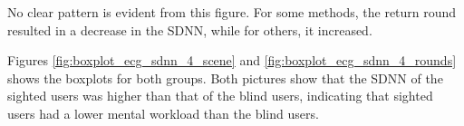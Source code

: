 
No clear pattern is evident from this figure. For some methods, the return round resulted in a decrease in the SDNN, while for others, it increased. 

Figures \ref{fig:boxplot_ecg_sdnn_4_scene} and \ref{fig:boxplot_ecg_sdnn_4_rounds} shows the boxplots for both groups. Both pictures show that the SDNN of the sighted users was higher than that of the blind users, indicating that sighted users had a lower mental workload than the blind users.

